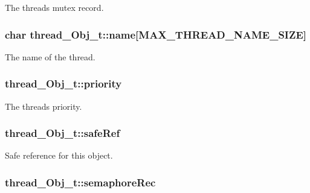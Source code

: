 The thread\textquotesingle{}s mutex record. 

\subsubsection[{\texorpdfstring{name}{name}}]{\setlength{\rightskip}{0pt plus 5cm}char thread\+\_\+\+Obj\+\_\+t\+::name\mbox{[}{\bf M\+A\+X\+\_\+\+T\+H\+R\+E\+A\+D\+\_\+\+N\+A\+M\+E\+\_\+\+S\+I\+ZE}\mbox{]}}\hypertarget{structthread___obj__t_a78946fc2ad93a3731b0be441f5d8dc94}{}\label{structthread___obj__t_a78946fc2ad93a3731b0be441f5d8dc94}


The name of the thread. 

\subsubsection[{\texorpdfstring{priority}{priority}}]{ thread\+\_\+\+Obj\+\_\+t\+::priority}\hypertarget{structthread___obj__t_ae4b49f8e4c11f31f01d214017b3d3f71}{}\label{structthread___obj__t_ae4b49f8e4c11f31f01d214017b3d3f71}


The thread\textquotesingle{}s priority. 

\subsubsection[{\texorpdfstring{safe\+Ref}{safeRef}}]{ thread\+\_\+\+Obj\+\_\+t\+::safe\+Ref}\hypertarget{structthread___obj__t_ac268584582c908726d0d746350972b2f}{}\label{structthread___obj__t_ac268584582c908726d0d746350972b2f}


Safe reference for this object. 

\subsubsection[{\texorpdfstring{semaphore\+Rec}{semaphoreRec}}]{ thread\+\_\+\+Obj\+\_\+t\+::semaphore\+Rec}\hypertarget{structthread___obj__t_a1eaf06f2bc7a29a871fc71a541051e3c}{}\label{structthread___obj__t_a1eaf06f2bc7a29a871fc71a541051e3c}


